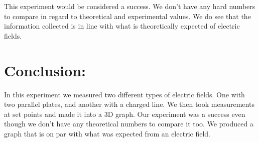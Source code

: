 \documentclass{article}
\begin{document}
This experiment would be considered a success.  We don't have any hard numbers to compare in regard to theoretical and experimental values.  We do see that the information collected is in line with what is theoretically expected of electric fields.

\singlespace
\newpage

\section*{Conclusion:}
In this experiment we measured two different types of electric fields.  One with two parallel plates, and another with a charged line.  We then took measurements at set points and made it into a 3D graph.  Our experiment was a success even though we don't have any theoretical numbers to compare it too.  We produced a graph that is on par with what was expected from an electric field.
\end{document}
